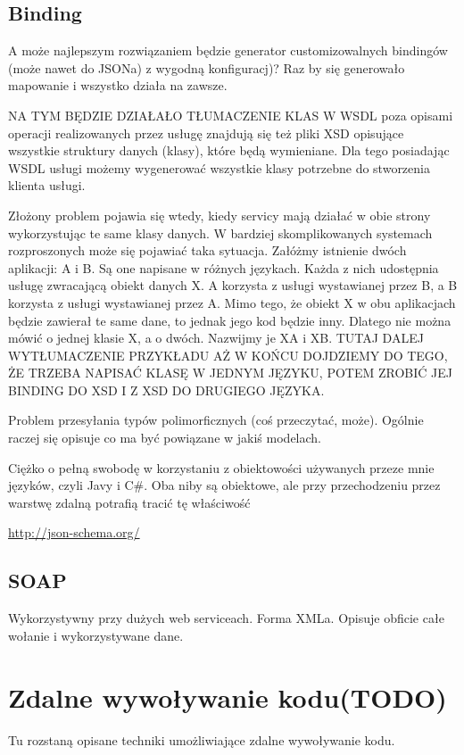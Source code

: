 \subsection{Binding}
A może najlepszym rozwiązaniem będzie generator customizowalnych bindingów (może nawet do JSONa) z wygodną konfiguracj)? Raz by się generowało mapowanie i wszystko działa na zawsze. 

NA TYM BĘDZIE DZIAŁAŁO TŁUMACZENIE KLAS
W WSDL poza opisami operacji realizowanych przez usługę znajdują się też pliki XSD opisujące wszystkie struktury danych (klasy), które będą wymieniane. Dla tego posiadając WSDL usługi możemy wygenerować wszystkie klasy potrzebne do stworzenia klienta usługi.

Złożony problem pojawia się wtedy, kiedy servicy mają działać w obie strony wykorzystując te same klasy danych. W bardziej skomplikowanych systemach rozproszonych może się pojawiać taka sytuacja. Załóżmy istnienie dwóch aplikacji: A i B. Są one napisane w różnych językach. Każda z nich udostępnia usługę zwracającą obiekt danych X. A korzysta z usługi wystawianej przez B, a B korzysta z usługi wystawianej przez A. Mimo tego, że obiekt X w obu aplikacjach będzie zawierał te same dane, to jednak jego kod będzie inny. Dlatego nie można mówić o jednej klasie X, a o dwóch. Nazwijmy je XA i XB. TUTAJ DALEJ WYTŁUMACZENIE PRZYKŁADU AŻ W KOŃCU DOJDZIEMY DO TEGO, ŻE TRZEBA NAPISAĆ KLASĘ W JEDNYM JĘZYKU, POTEM ZROBIĆ JEJ BINDING DO XSD I Z XSD DO DRUGIEGO JĘZYKA.

Problem przesyłania typów polimorficznych (coś przeczytać, może). Ogólnie raczej się opisuje co ma być powiązane w jakiś modelach.

Ciężko o pełną swobodę w korzystaniu z obiektowości używanych przeze mnie języków, czyli Javy i C\#. Oba niby są obiektowe, ale przy przechodzeniu przez warstwę zdalną potrafią tracić tę właściwość

\url{http://json-schema.org/}\\

\subsection{SOAP}
Wykorzystywny przy dużych web serviceach. Forma XMLa. Opisuje obficie całe wołanie i wykorzystywane dane.

\section{Zdalne wywoływanie kodu(TODO)}
Tu rozstaną opisane techniki umożliwiające zdalne wywoływanie kodu.

